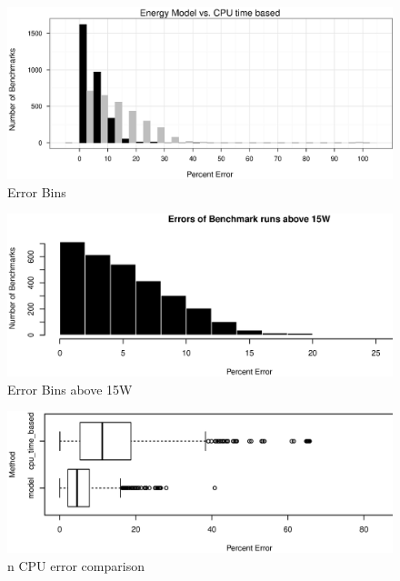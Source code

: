 \label{sec:evaluation}

\label{sec:error}

\begin{figure}
  \centering
    \includegraphics[width=\textwidth]{fig/hist-models.eps}
  \caption{Error Bins}
  \label{fig:err-hist}
\end{figure}

\begin{figure}
  \centering
    \includegraphics[width=\textwidth]{fig/hist-model-15W.eps}
  \caption{Error Bins above 15W}
  \label{fig:err-hist-15}
\end{figure}

\begin{figure}
  \centering
    \includegraphics[width=\textwidth]{fig/Ncpu-bench-errs.eps}
  \caption{n CPU error comparison}
  \label{fig:errs-ncpu}
\end{figure}

